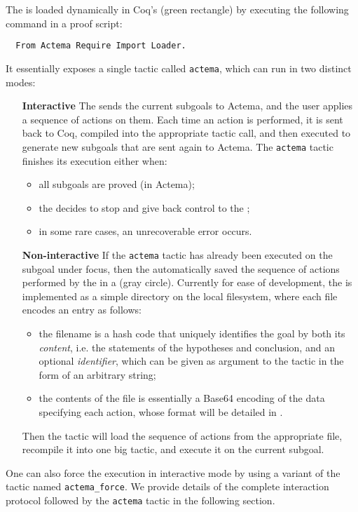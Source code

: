 The  is loaded dynamically in Coq's  (green
rectangle) by executing the following command in a proof script:
\begin{verbatim}
  From Actema Require Import Loader.
\end{verbatim}
It essentially exposes a single tactic called \texttt{actema}, which can run in
two distinct modes:
\begin{enumerate}
  \item[\bfseries Interactive] The  sends the current subgoals
  to Actema, and the user applies a sequence of actions on them. Each time an
  action is performed, it is sent back to Coq, compiled into the appropriate
  tactic call, and then executed to generate new subgoals that are sent again to
  Actema. The \texttt{actema} tactic finishes its execution either when:
  \begin{itemize}
    \item all subgoals are proved (in Actema);
    \item the  decides to stop and give back control to the
    ;
    \item in some rare cases, an unrecoverable error occurs.
  \end{itemize}

  \item[\bfseries Non-interactive] If the \texttt{actema} tactic has already
  been executed on the subgoal under focus, then the 
  automatically saved the sequence of actions performed by the  in
  a  (gray circle). Currently for ease of development, the
   is implemented as a simple directory on the local
  filesystem, where each file encodes an entry as follows:
  \begin{itemize}
    \item the filename is a hash code that uniquely identifies the goal by both
    its \emph{content}, i.e. the statements of the hypotheses and conclusion,
    and an optional \emph{identifier}, which can be given as argument to the
    tactic in the form of an arbitrary string;
    \item the contents of the file is essentially a Base64 encoding of the data
    specifying each action, whose format will be detailed in
    .
  \end{itemize}
  Then the tactic will load the sequence of actions from the appropriate file,
  recompile it into one big tactic, and execute it on the current subgoal.
\end{enumerate}
One can also force the execution in interactive mode by using a variant of the
tactic named \texttt{actema\_force}. We provide details of the complete
interaction protocol followed by the \texttt{actema} tactic in the following
section.

